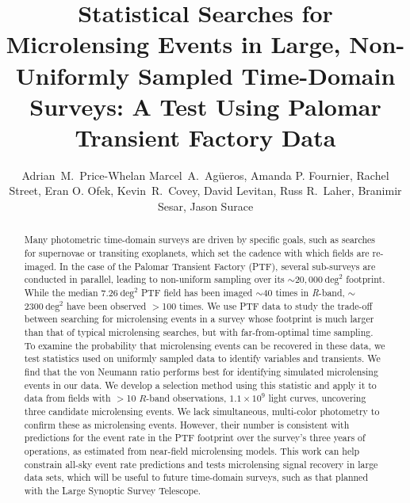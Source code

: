 \documentclass{emulateapj}
\begin{document}
\title{Statistical Searches for Microlensing Events in Large, Non-Uniformly Sampled Time-Domain Surveys: A Test Using Palomar Transient Factory Data}
\author{Adrian~M.~Price-Whelan Marcel~A.~Ag\"ueros, Amanda P. Fournier, Rachel Street, Eran O. Ofek, Kevin~R.~Covey, David Levitan, Russ R.~Laher, Branimir Sesar, Jason Surace}


\begin{abstract}
Many photometric time-domain surveys are driven by specific goals, such as searches for supernovae or transiting exoplanets, which set the cadence with which fields are re-imaged. In the case of the Palomar Transient Factory (PTF), several sub-surveys are conducted in parallel, leading to non-uniform sampling over its $\sim$$20,000~\mathrm{deg}^2$ footprint. While the median $7.26~\mathrm{deg}^2$ PTF field has been imaged $\sim$40 times in \textit{R}-band, $\sim$$2300~\mathrm{deg}^2$ have been observed $>$100 times. We use PTF data to study the trade-off between searching for microlensing events in a survey whose footprint is much larger than that of typical microlensing searches, but with far-from-optimal time sampling. To examine the probability that microlensing events can be recovered in these data, we test statistics used on uniformly sampled data to identify variables and transients. We find that the von Neumann ratio performs best for identifying simulated microlensing events in our data. We develop a selection method using this statistic and apply it to data from fields with $>$10 $R$-band observations, $1.1\times10^9$ light curves, uncovering three candidate microlensing events. We lack simultaneous, multi-color photometry to confirm these as microlensing events. However, their number is consistent with predictions for the event rate in the PTF footprint over the survey's three years of operations, as estimated from near-field microlensing models. This work can help constrain all-sky event rate predictions and tests microlensing signal recovery in large data sets, which will be useful to future time-domain surveys, such as that planned with the Large Synoptic Survey Telescope.
\end{abstract}
\end{document}
